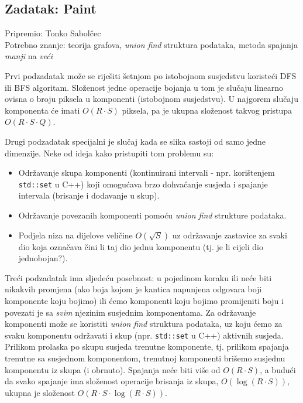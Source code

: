 \subsection*{Zadatak: Paint}
\textsf{Pripremio: Tonko Sabolčec}\\
\textsf{Potrebno znanje: teorija grafova, \textit{union find} struktura podataka,
  metoda spajanja \textit{manji} na \textit{veći}}

Prvi podzadatak može se riješiti šetnjom po istobojnom susjedstvu koristeći DFS
ili BFS algoritam. Složenost jedne operacije bojanja u tom je slučaju linearno
ovisna o broju piksela u komponenti (istobojnom susjedstvu). U
najgorem slučaju komponenta će imati $O(R \cdot S)$ piksela, pa je ukupna složenost
takvog pristupa $O(R \cdot S \cdot Q)$.

Drugi podzadatak specijalni je slučaj kada se slika sastoji od samo jedne
dimenzije. Neke od ideja kako pristupiti tom problemu su:
\begin{itemize}[topsep=0pt]
  \item Održavanje skupa komponenti (kontinuirani intervali - npr. korištenjem
    \verb|std::set| u C++) koji omogućava brzo dohvaćanje susjeda i spajanje
    intervala (brisanje i dodavanje u skup).
  \item Održavanje povezanih komponenti pomoću \textit{union find} strukture
    podataka.
  \item Podjela niza na dijelove veličine $O(\sqrt{S})$ uz održavanje
    zastavice za svaki dio koja označava čini li taj dio jednu komponentu
    (tj. je li cijeli dio jednobojan?).
\end{itemize}

Treći podzadatak ima sljedeću posebnost: u pojedinom koraku ili neće biti 
nikakvih promjena (ako boja kojom je kantica napunjena odgovara boji komponente
koju bojimo) ili ćemo komponenti koju bojimo promijeniti boju i povezati
je sa \textit{svim} njezinim susjednim komponentama. Za održavanje komponenti
može se koristiti \textit{union find} struktura podataka, uz koju ćemo za svaku
komponentu održavati i skup (npr. \verb|std::set| u C++) aktivnih susjeda. Prilikom
prolaska po skupu susjeda trenutne komponente, tj. prilikom spajanja trenutne sa susjednom komponentom,
trenutnoj komponenti brišemo susjednu komponentu iz skupa (i obrnuto).
Spajanja neće biti više od $O(R \cdot S)$, a budući da svako spajanje ima
složenost operacije brisanja iz skupa, $O(\log (R \cdot S))$, ukupna je složenost
$O(R \cdot S \cdot \log (R \cdot S))$.

